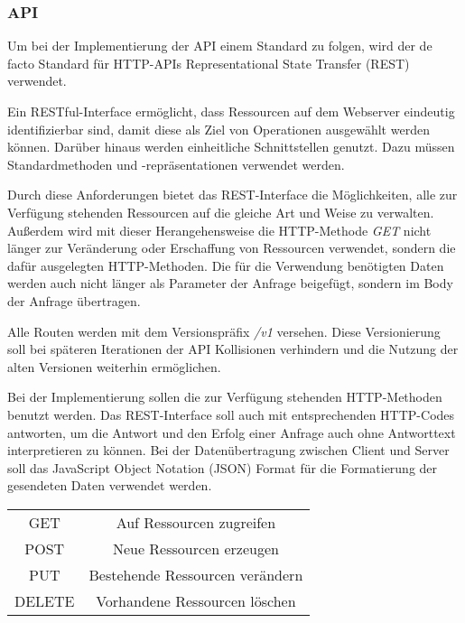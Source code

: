 \subsubsection{API}
Um bei der Implementierung der API einem Standard zu folgen, wird der de facto Standard für HTTP-APIs Representational State Transfer (REST) verwendet.

Ein RESTful-Interface ermöglicht, dass Ressourcen auf dem Webserver eindeutig identifizierbar sind, damit diese als Ziel von Operationen ausgewählt werden können. Darüber hinaus werden einheitliche Schnittstellen genutzt. Dazu müssen Standardmethoden und -repräsentationen verwendet werden. \cite{beimsWebApplikationenREST2014}

Durch diese Anforderungen bietet das REST-Interface die Möglichkeiten, alle zur Verfügung stehenden Ressourcen auf die gleiche Art und Weise zu verwalten. Außerdem wird mit dieser Herangehensweise die HTTP-Methode \textit{GET} nicht länger zur Veränderung oder Erschaffung von Ressourcen verwendet, sondern die dafür ausgelegten HTTP-Methoden. Die für die Verwendung benötigten Daten werden auch nicht länger als Parameter der Anfrage beigefügt, sondern im Body der Anfrage übertragen. \cite{beimsWebApplikationenREST2014}

Alle Routen werden mit dem Versionspräfix \textit{/v1} versehen. Diese Versionierung soll bei späteren Iterationen der API Kollisionen verhindern und die Nutzung der alten Versionen weiterhin ermöglichen. 

Bei der Implementierung sollen die zur Verfügung stehenden HTTP-Methoden benutzt werden. Das REST-Interface soll auch mit entsprechenden HTTP-Codes antworten, um die Antwort und den Erfolg einer Anfrage auch ohne Antworttext interpretieren zu können. Bei der Datenübertragung zwischen Client und Server soll das JavaScript Object Notation (JSON) Format für die Formatierung der gesendeten Daten verwendet werden.

\begin{center}
	\begin{tabular}{c c}
		GET & Auf Ressourcen zugreifen \\ 
		POST & Neue Ressourcen erzeugen \\  
		PUT & Bestehende Ressourcen verändern \\
		DELETE & Vorhandene Ressourcen löschen \\
	\end{tabular}
	\label{table:http-methods}
\end{center}

